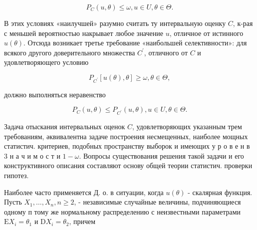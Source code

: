 \documentclass[10pt]{article}
\begin{document}
\[

P_{C}(u, \theta) \leqslant \omega, u \in U, \theta \in \Theta .

\]



В этих условиях «наилучшей» разумно считать ту интервальную оценку $C$, к-рая с меньшей вероятностью накрывает любое значение $u$, отличное от истинного $u(\theta)$. Отсюда возникает третье требование «наибольшей селективности»: для всякого другого доверительного множества $C^{\prime}$, отличного от $C$ и удовлетворяющего условию



\[

P_{C^{\prime}}[u(\theta), \theta] \geqslant \omega, \theta \in \Theta,

\]



должно выполняться неравенство



\[

P_{C}(u, \theta) \leqslant P_{C^{\prime}}(u, \theta), u \in U, \theta \in \Theta .

\]



Задача отыскания интервальных оценок $C$, удовлетворяющих указанным трем требованиям, әквивалентна задаче построения несмещенных, наиболее мощных статистич. критериев, подобных пространству выборок и имеющих у р о в е н в 3 н а ч и м о с т и $1-\omega$. Вопросы существования решения такой задачи и его конструктивного описания составляют основу общей теории статистич. проверки гипотез.



Наиболее часто применяется Д. о. в ситуации, когда $u(\theta)$ - скалярная функция. Пусть $X_{1}, \ldots, X_{n}, n \geqslant 2$, - независимые случайные величины, подчиняющиеся одному п тому же нормальному распределению с неизвестными параметрами $\mathrm{E} X_{i}=\theta_{1}$ и $\mathrm{D} X_{i}=\theta_{2}$, причем
\end{document}
